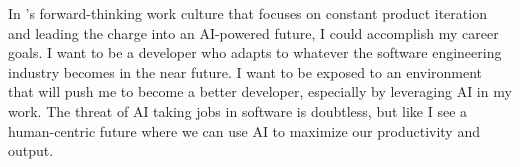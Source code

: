 



In \company's forward-thinking work culture that focuses on constant product iteration and leading the charge into an AI-powered future, I could accomplish my career goals. I want to be a developer who adapts to whatever the software engineering industry becomes in the near future. I want to be exposed to an environment that will push me to become a better developer, especially by leveraging AI in my work. The threat of AI taking jobs in software is doubtless, but like \company\;I see a human-centric future where we can use AI to maximize our productivity and output.
